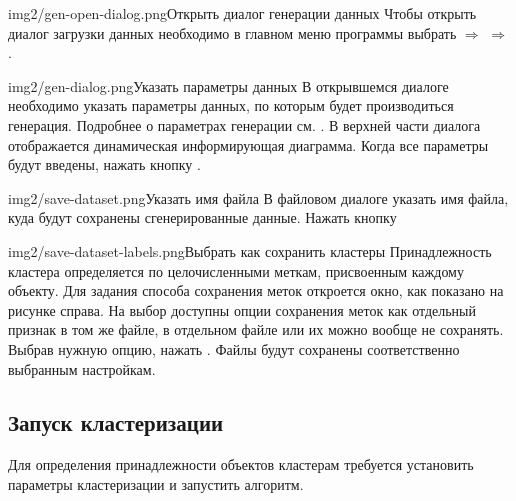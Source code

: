 \documentclass[12pt,tikz]{instruction}
\begin{document}
\begin{steps}
	\begin{ist}{img2/gen-open-dialog.png}{Открыть диалог генерации данных}
		Чтобы открыть диалог загрузки данных необходимо в главном меню программы выбрать  $\Rightarrow$  $\Rightarrow$ .
	\end{ist}
	\begin{ist}{img2/gen-dialog.png}{Указать параметры данных}
		В открывшемся диалоге необходимо указать параметры данных, по которым будет производиться генерация. Подробнее о параметрах генерации см. \cite{kovaleva}. В верхней части диалога отображается динамическая информирующая диаграмма. Когда все параметры будут введены, нажать кнопку . \vspace{1.2cm}
	\end{ist}
	\begin{ist}{img2/save-dataset.png}{Указать имя файла}
		В файловом диалоге указать имя файла, куда будут сохранены сгенерированные данные. Нажать кнопку  
	\end{ist}
	\begin{ist}{img2/save-dataset-labels.png}{Выбрать как сохранить кластеры}
		Принадлежность кластера определяется по целочисленными меткам, присвоенным каждому объекту. Для задания способа сохранения меток откроется окно, как показано на рисунке справа. На выбор доступны опции сохранения меток как отдельный признак в том же файле, в отдельном файле или их можно вообще не сохранять. Выбрав нужную опцию, нажать . Файлы будут сохранены соответственно выбранным настройкам.
	\end{ist}
\end{steps}

\newpage
\subsection{Запуск кластеризации}

Для определения принадлежности объектов кластерам требуется установить параметры кластеризации и запустить алгоритм.
\end{document}
